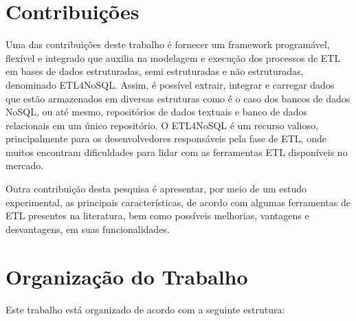 
\section{Contribuições}

Uma das contribuições deste trabalho é fornecer um framework programável, flexível e integrado que auxilia na modelagem e execução dos processos de ETL em bases de dados estruturadas, semi estruturadas e não estruturadas, denominado ETL4NoSQL. Assim, é possível extrair, integrar e carregar dados que estão armazenados em diversas estruturas como é o caso dos bancos de dados NoSQL, ou até mesmo, repositórios de dados textuais e banco de dados relacionais em um único repositório. O ETL4NoSQL é um recurso valioso, principalmente para os desenvolvedores responsáveis pela fase de ETL, onde muitos encontram dificuldades para lidar com as ferramentas ETL disponíveis no mercado. 

Outra contribuição desta pesquisa é apresentar, por meio de um estudo experimental, as principais características, de acordo com algumas ferramentas de ETL presentes na literatura, bem como possíveis melhorias, vantagens e desvantagens, em suas funcionalidades.

\section{Organização do Trabalho}

Este trabalho está organizado de acordo com a seguinte estrutura:

